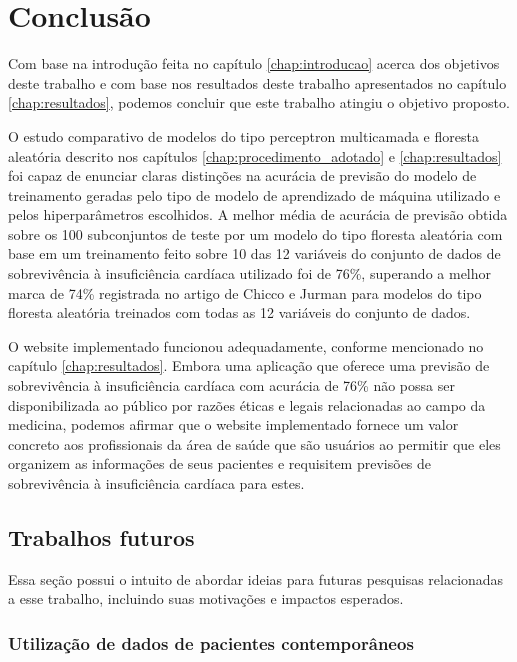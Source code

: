 \chapter{Conclusão} \label{chap:conclusao}

Com base na introdução feita no capítulo \ref{chap:introducao} acerca dos objetivos deste trabalho e com base nos resultados deste trabalho apresentados no capítulo \ref{chap:resultados}, podemos concluir que este trabalho atingiu o objetivo proposto.

O estudo comparativo de modelos do tipo perceptron multicamada e floresta aleatória descrito nos capítulos \ref{chap:procedimento_adotado} e \ref{chap:resultados} foi capaz de enunciar claras distinções na acurácia de previsão do modelo de treinamento geradas pelo tipo de modelo de aprendizado de máquina utilizado e pelos hiperparâmetros escolhidos. A melhor média de acurácia de previsão obtida sobre os 100 subconjuntos de teste por um modelo do tipo floresta aleatória com base em um treinamento feito sobre 10 das 12 variáveis do conjunto de dados de sobrevivência à insuficiência cardíaca utilizado \cite{larxel_dataset} foi de 76\%, superando a melhor marca de 74\% registrada no artigo de Chicco e Jurman \cite{chicco2020} para modelos do tipo floresta aleatória treinados com todas as 12 variáveis do conjunto de dados.

O website implementado funcionou adequadamente, conforme mencionado no capítulo \ref{chap:resultados}. Embora uma aplicação que oferece uma previsão de sobrevivência à insuficiência cardíaca com acurácia de 76\% não possa ser disponibilizada ao público por razões éticas e legais relacionadas ao campo da medicina, podemos afirmar que o website implementado fornece um valor concreto aos profissionais da área de saúde que são usuários ao permitir que eles organizem as informações de seus pacientes e requisitem previsões de sobrevivência à insuficiência cardíaca para estes.

\section{Trabalhos futuros}

Essa seção possui o intuito de abordar ideias para futuras pesquisas relacionadas a esse trabalho, incluindo suas motivações e impactos esperados.

\subsection{Utilização de dados de pacientes contemporâneos}

